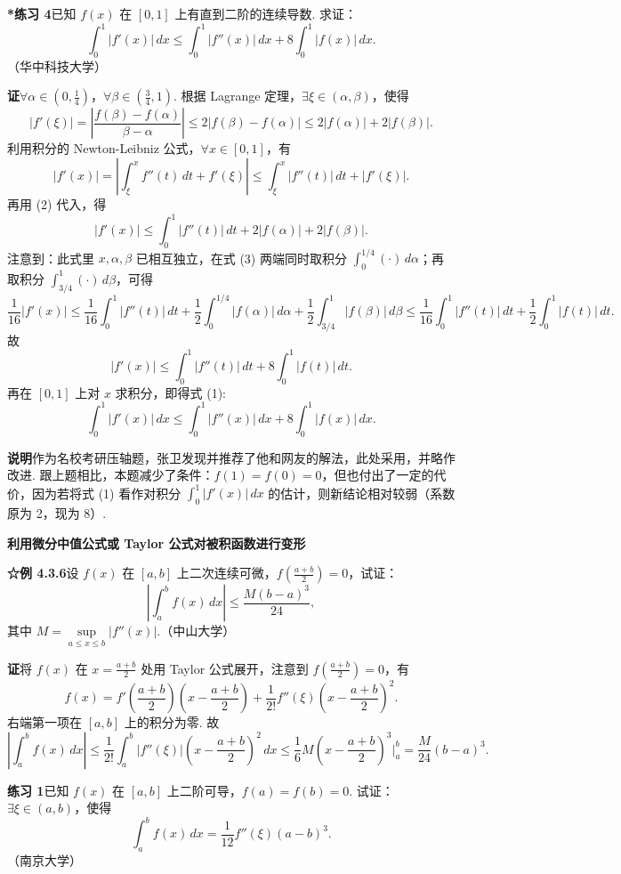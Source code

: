 \documentclass[UTF8,12pt,a4paper,fontset=fandol]{ctexart}
\begin{document}
\noindent\textbf{*练习 4}\quad 已知 $f(x)$ 在 $[0,1]$ 上有直到二阶的连续导数. 求证：
\[
\int_0^1|f'(x)|\,dx
\le\int_0^1|f''(x)|\,dx+8\int_0^1|f(x)|\,dx.
\tag{1}
\]
（华中科技大学）

\noindent\textbf{证}\quad $\forall\alpha\in(0,\frac14)$，$\forall\beta\in(\frac34,1)$. 根据 Lagrange 定理，$\exists\xi\in(\alpha,\beta)$，使得
\[
|f'(\xi)|
=\left|\frac{f(\beta)-f(\alpha)}{\beta-\alpha}\right|
\le2|f(\beta)-f(\alpha)|
\le2|f(\alpha)|+2|f(\beta)|.
\tag{2}
\]
利用积分的 Newton-Leibniz 公式，$\forall x\in[0,1]$，有
\[
|f'(x)|=\left|\int_\xi^x f''(t)\,dt+f'(\xi)\right|
\le\int_\xi^x|f''(t)|\,dt+|f'(\xi)|.
\]
再用 (2) 代入，得
\[
|f'(x)|\le\int_0^1|f''(t)|\,dt+2|f(\alpha)|+2|f(\beta)|.
\tag{3}
\]
注意到：此式里 $x,\alpha,\beta$ 已相互独立，在式 (3) 两端同时取积分 $\int_0^{1/4}(\cdot)\,d\alpha$；再取积分 $\int_{3/4}^1(\cdot)\,d\beta$，可得
\[
\frac1{16}|f'(x)|
\le\frac1{16}\int_0^1|f''(t)|\,dt
+\frac12\int_0^{1/4}|f(\alpha)|\,d\alpha
+\frac12\int_{3/4}^1|f(\beta)|\,d\beta
\le\frac1{16}\int_0^1|f''(t)|\,dt+\frac12\int_0^1|f(t)|\,dt.
\]
故
\[
|f'(x)|\le\int_0^1|f''(t)|\,dt+8\int_0^1|f(t)|\,dt.
\]
再在 $[0,1]$ 上对 $x$ 求积分，即得式 (1):
\[
\int_0^1|f'(x)|\,dx
\le\int_0^1|f''(x)|\,dx+8\int_0^1|f(x)|\,dx.
\]

\noindent\textbf{说明}\quad 作为名校考研压轴题，张卫发现并推荐了他和网友的解法，此处采用，并略作改进. 跟上题相比，本题减少了条件：$f(1)=f(0)=0$，但也付出了一定的代价，因为若将式 (1) 看作对积分 $\int_0^1|f'(x)|\,dx$ 的估计，则新结论相对较弱（系数原为 2，现为 8）.

\noindent\textbf{利用微分中值公式或 Taylor 公式对被积函数进行变形}

\noindent\textbf{☆例 4.3.6}\quad 设 $f(x)$ 在 $[a,b]$ 上二次连续可微，$f(\frac{a+b}{2})=0$，试证：
\[
\left|\int_a^b f(x)\,dx\right|\le\frac{M(b-a)^3}{24},
\]
其中 $M=\sup\limits_{a\le x\le b}|f''(x)|$.（中山大学）

\noindent\textbf{证}\quad 将 $f(x)$ 在 $x=\frac{a+b}{2}$ 处用 Taylor 公式展开，注意到 $f(\frac{a+b}{2})=0$，有
\[
f(x)=f'\left(\frac{a+b}{2}\right)\left(x-\frac{a+b}{2}\right)
+\frac1{2!}f''(\xi)\left(x-\frac{a+b}{2}\right)^2.
\]
右端第一项在 $[a,b]$ 上的积分为零. 故
\[
\left|\int_a^b f(x)\,dx\right|
\le\frac1{2!}\int_a^b|f''(\xi)|\left(x-\frac{a+b}{2}\right)^2\,dx
\le\frac16M\left(x-\frac{a+b}{2}\right)^3\bigg|_a^b
=\frac{M}{24}(b-a)^3.
\]

\noindent\textbf{练习 1}\quad 已知 $f(x)$ 在 $[a,b]$ 上二阶可导，$f(a)=f(b)=0$. 试证：$\exists\xi\in(a,b)$，使得
\[
\int_a^b f(x)\,dx=\frac1{12}f''(\xi)(a-b)^3.
\]
（南京大学）
\end{document}
